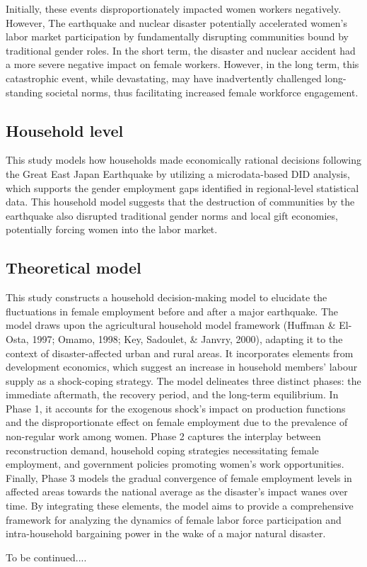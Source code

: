 \documentclass[12pt,halfline,a4paper]{ouparticle}
\begin{document}
Initially, these events disproportionately impacted women workers negatively. However, The earthquake and nuclear disaster potentially accelerated women's labor market participation by fundamentally disrupting communities bound by traditional gender roles. In the short term, the disaster and nuclear accident had a more severe negative impact on female workers. However, in the long term, this catastrophic event, while devastating, may have inadvertently challenged long-standing societal norms, thus facilitating increased female workforce engagement.

\newpage

\subsection{Household level}
\label{sec5.1}

This study models how households made economically rational decisions following the Great East Japan Earthquake by utilizing a microdata-based DID analysis, which supports the gender employment gaps identified in regional-level statistical data. This household model suggests that the destruction of communities by the earthquake also disrupted traditional gender norms and local gift economies, potentially forcing women into the labor market.


\subsection{Theoretical model}
\label{sec5.1}

This study constructs a household decision-making model to elucidate the fluctuations in female employment before and after a major earthquake. The model draws upon the agricultural household model framework (Huffman \& El-Osta, 1997; Omamo, 1998; Key, Sadoulet, \& Janvry, 2000), adapting it to the context of disaster-affected urban and rural areas. It incorporates elements from development economics, which suggest an increase in household members' labour supply as a shock-coping strategy.
The model delineates three distinct phases: the immediate aftermath, the recovery period, and the long-term equilibrium. In Phase 1, it accounts for the exogenous shock's impact on production functions and the disproportionate effect on female employment due to the prevalence of non-regular work among women. Phase 2 captures the interplay between reconstruction demand, household coping strategies necessitating female employment, and government policies promoting women's work opportunities. Finally, Phase 3 models the gradual convergence of female employment levels in affected areas towards the national average as the disaster's impact wanes over time.
By integrating these elements, the model aims to provide a comprehensive framework for analyzing the dynamics of female labor force participation and intra-household bargaining power in the wake of a major natural disaster.


To be continued....



\nocite{*}

\end{document}
